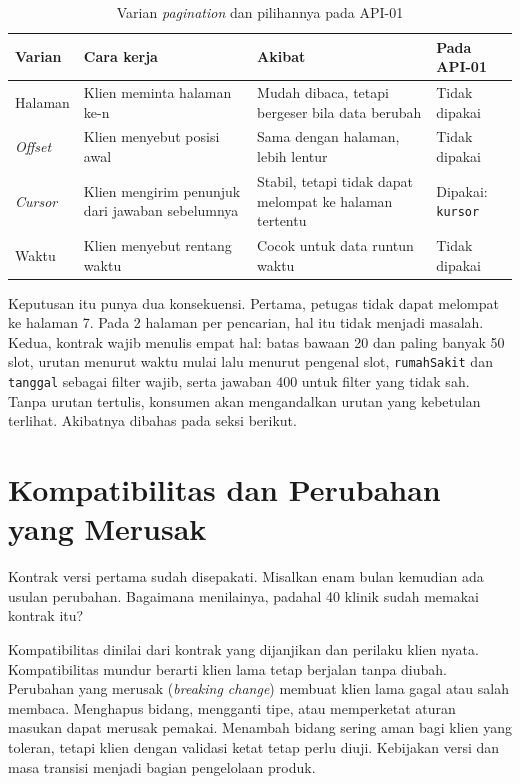 \begin{table}[!htb]
  \centering
  \caption{Varian \textit{pagination} dan pilihannya pada API-01}
  \label{tab:ch09-pagination}
  \footnotesize
  \begin{tabularx}{\textwidth}{H{2.0cm}GGH{2.6cm}}
    \hline
    \textbf{Varian} & \textbf{Cara kerja} & \textbf{Akibat} & \textbf{Pada API-01} \\ \hline
    Halaman & Klien meminta halaman ke-n & Mudah dibaca, tetapi bergeser bila data berubah & Tidak dipakai \\ \hline
    \textit{Offset} & Klien menyebut posisi awal & Sama dengan halaman, lebih lentur & Tidak dipakai \\ \hline
    \textit{Cursor} & Klien mengirim penunjuk dari jawaban sebelumnya & Stabil, tetapi tidak dapat melompat ke halaman tertentu & Dipakai: \texttt{kursor} \\ \hline
    Waktu & Klien menyebut rentang waktu & Cocok untuk data runtun waktu & Tidak dipakai \\ \hline
  \end{tabularx}
\end{table}

Keputusan itu punya dua konsekuensi. Pertama, petugas tidak dapat melompat ke halaman 7. Pada 2 halaman per pencarian, hal itu tidak menjadi masalah. Kedua,
kontrak wajib menulis empat hal: batas bawaan 20 dan paling banyak 50 slot, urutan menurut waktu mulai lalu menurut pengenal slot, \texttt{rumahSakit} dan
\texttt{tanggal} sebagai filter wajib, serta jawaban 400 untuk filter yang tidak sah. Tanpa urutan tertulis, konsumen akan mengandalkan urutan yang kebetulan
terlihat. Akibatnya dibahas pada seksi berikut.

\section{Kompatibilitas dan Perubahan yang Merusak}

Kontrak versi pertama sudah disepakati. Misalkan enam bulan kemudian ada usulan perubahan. Bagaimana menilainya, padahal 40 klinik sudah memakai kontrak itu?

Kompatibilitas dinilai dari kontrak yang dijanjikan dan perilaku klien nyata. Kompatibilitas mundur berarti klien lama tetap berjalan tanpa diubah. Perubahan
yang merusak (\textit{breaking change}) membuat klien lama gagal atau salah membaca. Menghapus bidang, mengganti tipe, atau memperketat aturan masukan dapat merusak
pemakai. Menambah bidang sering aman bagi klien yang toleran, tetapi klien dengan validasi ketat tetap perlu diuji. Kebijakan versi dan masa transisi menjadi bagian
pengelolaan produk.

